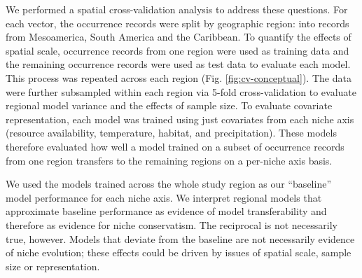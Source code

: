 We performed a spatial cross-validation analysis to address these questions. For each vector, the occurrence records were split by geographic region: into records from Mesoamerica, South America and the Caribbean. To quantify the effects of spatial scale, occurrence records from one region were used as training data and the remaining occurrence records were used as test data to evaluate each model. This process was repeated across each region (Fig. \ref{fig:cv-conceptual}). The data were further subsampled within each region via 5-fold cross-validation to evaluate regional model variance and the effects of sample size. To evaluate covariate representation, each model was trained using just covariates from each niche axis (resource availability, temperature, habitat, and precipitation). These models therefore evaluated how well a model trained on a subset of occurrence records from one region transfers to the remaining regions on a per-niche axis basis. 

We used the models trained across the whole study region as our “baseline” model performance for each niche axis. We interpret regional models that approximate baseline performance as evidence of model transferability and therefore as evidence for niche conservatism. The reciprocal is not necessarily true, however. Models that deviate from the baseline are not necessarily evidence of niche evolution; these effects could be driven by issues of spatial scale, sample size or representation.

